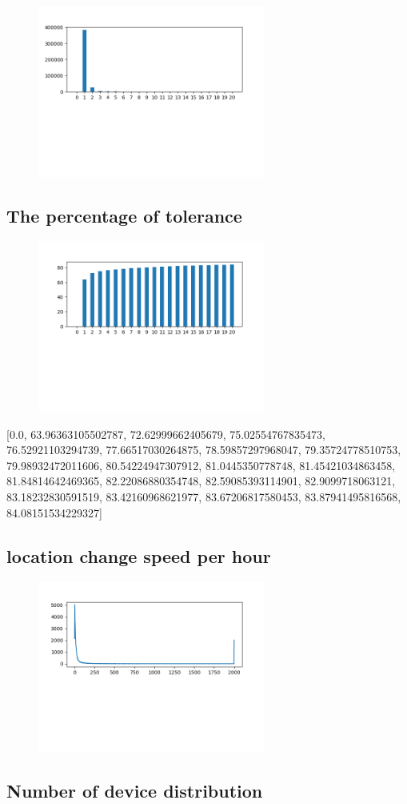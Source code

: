\documentclass[10pt, conference, compsocconf]{IEEEtran}
\begin{document}
\begin{figure}[H]\centering\includegraphics[width=75mm,scale=0.5]{BasedonClientIDnumberofusersfingerprint}\end{figure}\subsection{The percentage of tolerance}
\begin{figure}[H]\centering\includegraphics[width=75mm,scale=0.5]{BasedonClientIDtolerance}\end{figure}[0.0, 63.96363105502787, 72.62999662405679, 75.02554767835473, 76.52921103294739, 77.66517030264875, 78.59857297968047, 79.35724778510753, 79.98932472011606, 80.54224947307912, 81.0445350778748, 81.45421034863458, 81.84814642469365, 82.22086880354748, 82.59085393114901, 82.9099718063121, 83.18232830591519, 83.42160968621977, 83.67206817580453, 83.87941495816568, 84.08151534229327]\subsection{location change speed per hour}
\begin{figure}[H]\centering\includegraphics[width=75mm,scale=0.5]{BasedonClientIDlocationchange}\end{figure}\subsection{Number of device distribution}
\end{document}
